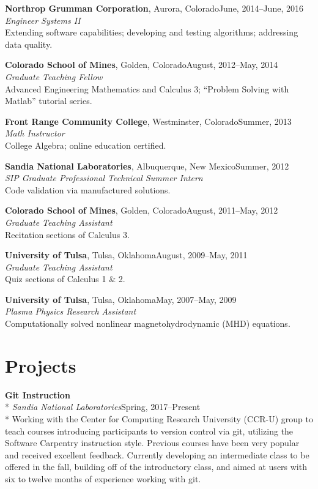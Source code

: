 \documentclass[margin,line,pifont,palatino,10pt]{res}
\begin{document}
\begin{resume}
{\bf Northrop Grumman Corporation}, Aurora, Colorado\hfill June, 2014--June, 2016\\
{\em Engineer Systems II}\\
Extending software capabilities; developing and testing algorithms; addressing data quality.

{\bf Colorado School of Mines}, Golden, Colorado\hfill August, 2012--May, 2014\\
{\em Graduate Teaching Fellow}\\
Advanced Engineering Mathematics and Calculus 3; ``Problem Solving with Matlab'' tutorial series.

{\bf Front Range Community College}, Westminster, Colorado\hfill Summer, 2013\\
{\em Math Instructor}\\
College Algebra; online education certified.

{\bf Sandia National Laboratories}, Albuquerque, New Mexico\hfill Summer, 2012\\
{\em SIP Graduate Professional Technical Summer Intern}\\
Code validation via manufactured solutions.

{\bf Colorado School of Mines}, Golden, Colorado\hfill August, 2011--May, 2012\\
{\em Graduate Teaching Assistant}\\
Recitation sections of Calculus 3.

{\bf University of Tulsa}, Tulsa, Oklahoma\hfill August, 2009--May, 2011\\
{\em Graduate Teaching Assistant}\\
Quiz sections of Calculus 1 \& 2.

{\bf University of Tulsa}, Tulsa, Oklahoma\hfill May, 2007--May, 2009\\
{\em Plasma Physics Research Assistant}\\
Computationally solved nonlinear magnetohydrodynamic (MHD) equations.

\pagebreak
\section{\sc Projects}
{\bf Git Instruction}\\*
{\it Sandia National Laboratories}\hfill Spring, 2017--Present\\*
Working with the Center for Computing Research University (CCR-U) group to teach courses introducing participants to version control via git, utilizing the Software Carpentry instruction style.  Previous courses have been very popular and received excellent feedback.  Currently developing an intermediate class to be offered in the fall, building off of the introductory class, and aimed at users with six to twelve months of experience working with git.


\end{resume}
\end{document}
